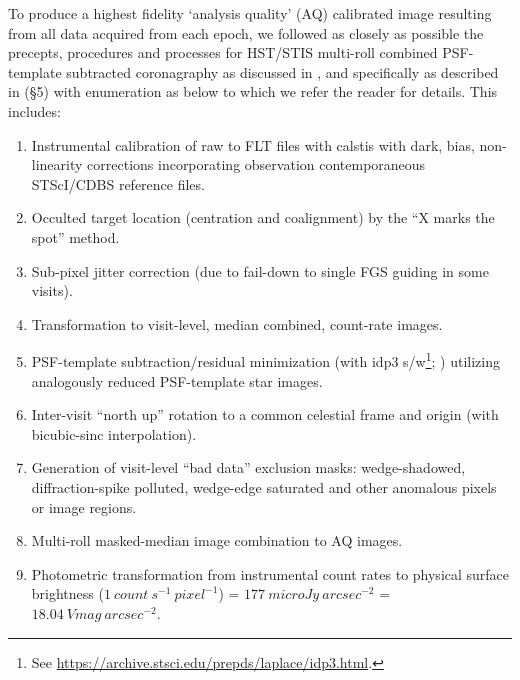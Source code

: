 \documentclass{aa}
\begin{document}
To produce a highest fidelity ‘analysis quality’ (AQ) calibrated image resulting from all data acquired from each epoch, we followed as closely as possible the precepts, procedures and processes for HST/STIS multi-roll combined PSF-template subtracted coronagraphy as discussed in \cite{schneider2014probing}, and specifically as described in \cite{schneider2016extinction} (§5) with enumeration as below to which we refer the reader for details. 
This includes: 
\begin{enumerate}
    \item Instrumental calibration of raw to FLT files with calstis  with dark, bias, non-linearity corrections incorporating observation contemporaneous STScI/CDBS reference files.
    \item Occulted target location (centration and coalignment) by the “X marks the spot” method.
    \item Sub-pixel jitter correction (due to fail-down to single FGS guiding in some visits).
    \item Transformation to visit-level, median combined, count-rate images.
    \item PSF-template subtraction/residual minimization (with idp3 s/w\footnote{See \url{ https://archive.stsci.edu/prepds/laplace/idp3.html}.}; \cite{stobie2006idp3}) utilizing analogously reduced PSF-template star images.
    \item Inter-visit “north up” rotation to a common celestial frame and origin (with bicubic-sinc interpolation).
    \item Generation of visit-level “bad data” exclusion masks: wedge-shadowed, diffraction-spike polluted, wedge-edge saturated and other anomalous pixels or image regions.
    \item Multi-roll masked-median image combination to AQ images.
    \item Photometric transformation from instrumental count rates to physical surface brightness ($1 ~count ~ s^{-1} ~pixel^{-1}$) = $177~microJy~ arcsec^{-2}$ = $18.04 ~Vmag ~arcsec^{-2}$.
\end{enumerate}
\end{document}
